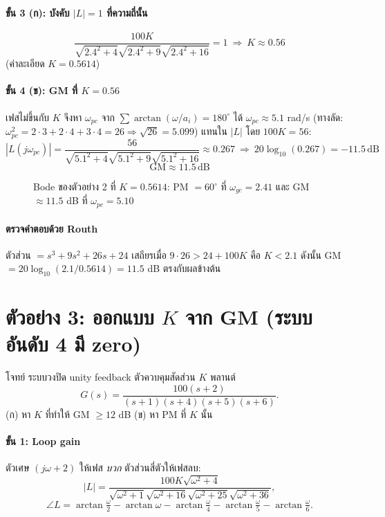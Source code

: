 \documentclass[12pt,a4paper]{article}
\newcommand{\dB}{\,\mathrm{dB}}
\newcommand{\jw}{j\omega}
\newcommand{\atan}{\operatorname{arctan}}
\begin{document}
\paragraph{ขั้น 3 (ก): บังคับ $|L|=1$ ที่ความถี่นั้น}
\[
\frac{100K}{\sqrt{2.4^2+4}\sqrt{2.4^2+9}\sqrt{2.4^2+16}}=1
\ \Rightarrow\ \boxed{K\approx0.56}
\]
(ค่าละเอียด $K=0.5614$)

\paragraph{ขั้น 4 (ข): GM ที่ $K=0.56$}
เฟสไม่ขึ้นกับ $K$ จึงหา $\omega_{pc}$ จาก $\sum\atan(\omega/a_i)=180^\circ$ ได้ $\omega_{pc}\approx5.1$ rad/s (ทางลัด: $\omega_{pc}^2=2\cdot3+2\cdot4+3\cdot4=26\Rightarrow\sqrt{26}=5.099$) แทนใน $|L|$ โดย $100K=56$:
\[
|L(j\omega_{pc})|=\frac{56}{\sqrt{5.1^2+4}\sqrt{5.1^2+9}\sqrt{5.1^2+16}}\approx0.267
\ \Rightarrow\ 20\log_{10}(0.267)=-11.5\dB
\]
\[
\boxed{\mathrm{GM}\approx11.5\dB}
\]

\begin{figure}[h]
\centering

\caption{Bode ของตัวอย่าง 2 ที่ $K=0.5614$: PM $=60^\circ$ ที่ $\omega_{gc}=2.41$ และ GM $\approx11.5$ dB ที่ $\omega_{pc}=5.10$}
\end{figure}

\paragraph{ตรวจคำตอบด้วย Routh}
ตัวส่วน $=s^3+9s^2+26s+24$ เสถียรเมื่อ $9\cdot26>24+100K$ คือ $K<2.1$ ดังนั้น GM $=20\log_{10}(2.1/0.5614)=11.5$ dB ตรงกับผลข้างต้น

\section{ตัวอย่าง 3: ออกแบบ $K$ จาก GM (ระบบอันดับ 4 มี zero)}
\begin{exbox}{โจทย์}
ระบบวงปิด unity feedback ตัวควบคุมสัดส่วน $K$ พลานต์
\[
G(s)=\frac{100(s+2)}{(s+1)(s+4)(s+5)(s+6)}.
\]
(ก) หา $K$ ที่ทำให้ GM $\ge12$ dB \quad (ข) หา PM ที่ $K$ นั้น
\end{exbox}

\paragraph{ขั้น 1: Loop gain}
ตัวเศษ $(\jw+2)$ ให้เฟส \emph{บวก} ตัวส่วนสี่ตัวให้เฟสลบ:
\[
|L|=\frac{100K\sqrt{\omega^2+4}}{\sqrt{\omega^2+1}\sqrt{\omega^2+16}\sqrt{\omega^2+25}\sqrt{\omega^2+36}},
\]
\[
\angle L=\atan\tfrac{\omega}{2}-\atan\omega-\atan\tfrac{\omega}{4}-\atan\tfrac{\omega}{5}-\atan\tfrac{\omega}{6}.
\]
\end{document}
